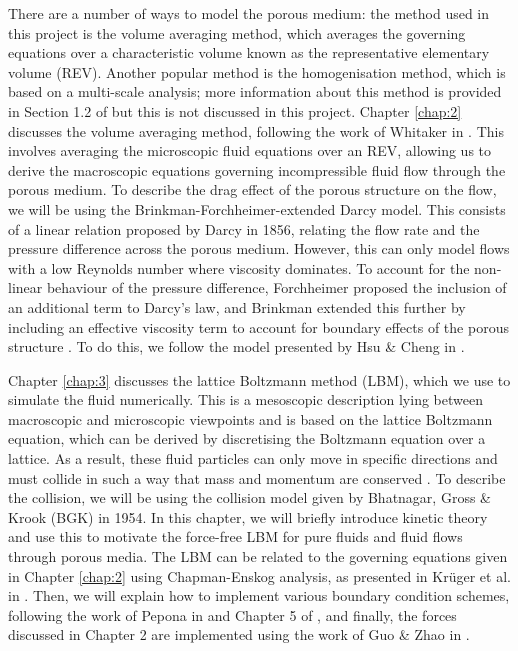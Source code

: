 \documentclass[a4paper, 11pt]{report}
\begin{document}
There are a number of ways to model the porous medium: the method used in this project is the volume averaging method, which averages the governing equations over a characteristic volume known as the representative elementary volume (REV). Another popular method is the homogenisation method, which is based on a multi-scale analysis; more information about this method is provided in Section 1.2 of \cite{homogenization} but this is not discussed in this project. Chapter \ref{chap:2} discusses the volume averaging method, following the work of Whitaker in \cite{whitakerforchheimer}. This involves averaging the microscopic fluid equations over an REV, allowing us to derive the macroscopic equations governing incompressible fluid flow through the porous medium. To describe the drag effect of the porous structure on the flow, we will be using the Brinkman-Forchheimer-extended Darcy model. This consists of a linear relation proposed by Darcy in 1856, relating the flow rate and the pressure difference across the porous medium. However, this can only model flows with a low Reynolds number where viscosity dominates. To account for the non-linear behaviour of the pressure difference, Forchheimer proposed the inclusion of an additional term to Darcy's law, and Brinkman extended this further by including an effective viscosity term to account for boundary effects of the porous structure \cite[Chapter~1]{mp}. To do this, we follow the model presented by Hsu \& Cheng in \cite{hsu+cheng}.


Chapter \ref{chap:3} discusses the lattice Boltzmann method (LBM), which we use to simulate the fluid numerically. This is a mesoscopic description lying between macroscopic and microscopic viewpoints and is based on the lattice Boltzmann equation, which can be derived by discretising the Boltzmann equation over a lattice. As a result, these fluid particles can only move in specific directions and must collide in such a way that mass and momentum are conserved \cite[Chapter~3]{lbtextbook}. To describe the collision, we will be using the collision model given by Bhatnagar, Gross \& Krook (BGK) \cite{bgk} in 1954. In this chapter, we will briefly introduce kinetic theory and use this to motivate the force-free LBM for pure fluids and fluid flows through porous media. The LBM can be related to the governing equations given in Chapter \ref{chap:2} using Chapman-Enskog analysis, as presented in Kr{\"u}ger et al. in \cite[Chapters~3-4]{lbtextbook}. Then, we will explain how to implement various boundary condition schemes, following the work of Pepona in \cite[Chapter 3]{mp} and Chapter 5 of \cite{lbtextbook}, and finally, the forces discussed in Chapter 2 are implemented using the work of Guo \& Zhao in \cite{guo+zhao}.
\end{document}
